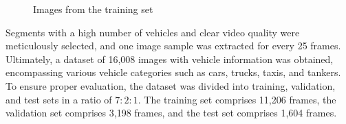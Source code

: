 \documentclass[aic]{iosart2x}
\begin{document}
\begin{figure}[htbp]
    
    \centering    
    
    
    \caption{Images from the training set}

    
\end{figure}

Segments with a high number of vehicles and clear video quality were meticulously selected, and one image sample was extracted for every 25 frames. Ultimately, a dataset of 16,008 images with vehicle information was obtained, encompassing various vehicle categories such as cars, trucks, taxis, and tankers. To ensure proper evaluation, the dataset was divided into training, validation, and test sets in a ratio of $7:2:1$. The training set comprises 11,206 frames, the validation set comprises 3,198 frames, and the test set comprises 1,604 frames.
\end{document}
